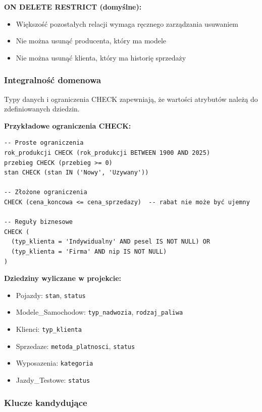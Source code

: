 \documentclass[a4paper,titleauthor]{mwart}
\begin{document}
	\textbf{ON DELETE RESTRICT (domyślne):}
	\begin{itemize}
		\item Większość pozostałych relacji wymaga ręcznego zarządzania usuwaniem
		\item Nie można usunąć producenta, który ma modele
		\item Nie można usunąć klienta, który ma historię sprzedaży
	\end{itemize}

	\subsubsection{Integralność domenowa}

	Typy danych i ograniczenia CHECK zapewniają, że wartości atrybutów należą do zdefiniowanych dziedzin.

	\textbf{Przykładowe ograniczenia CHECK:}

	\begin{verbatim}
-- Proste ograniczenia
rok_produkcji CHECK (rok_produkcji BETWEEN 1900 AND 2025)
przebieg CHECK (przebieg >= 0)
stan CHECK (stan IN ('Nowy', 'Uzywany'))

-- Złożone ograniczenia
CHECK (cena_koncowa <= cena_sprzedazy)  -- rabat nie może być ujemny

-- Reguły biznesowe
CHECK (
  (typ_klienta = 'Indywidualny' AND pesel IS NOT NULL) OR
  (typ_klienta = 'Firma' AND nip IS NOT NULL)
)
	\end{verbatim}

	\textbf{Dziedziny wyliczane w projekcie:}

	\begin{itemize}
		\item Pojazdy: \texttt{stan}, \texttt{status}
		\item Modele\_Samochodow: \texttt{typ\_nadwozia}, \texttt{rodzaj\_paliwa}
		\item Klienci: \texttt{typ\_klienta}
		\item Sprzedaze: \texttt{metoda\_platnosci}, \texttt{status}
		\item Wyposazenia: \texttt{kategoria}
		\item Jazdy\_Testowe: \texttt{status}
	\end{itemize}

	\subsubsection{Klucze kandydujące}
\end{document}
